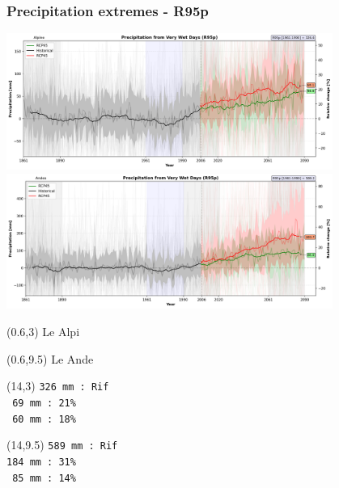 
\begin{frame}
\frametitle{Precipitation extremes - R95p}
\begin{center}

{\includegraphics[width=0.8\textwidth]{risultati/r95p_Alpine_Models_ts}}
{\includegraphics[width=0.8\textwidth]{risultati/r95p_Andes_Models_ts}}
\end{center}

{
  \scriptsize
  \begin{textblock}{1.8}(0.6,3)
     {\color{gray} Le Alpi}
  \end{textblock}
}


{
  \scriptsize
  \begin{textblock}{1.8}(0.6,9.5)
     {\color{gray} Le Ande}
  \end{textblock}
}

{ \tiny
  \begin{textblock}{3}(14,3)
     {\color{CadetBlue}   \texttt{326 mm : Rif}} \\
     {\color{red}         \texttt{ 69 mm : 21\% }}\\
     {\color{ForestGreen} \texttt{ 60 mm : 18\% }}
  \end{textblock}
}

{ \tiny
  \begin{textblock}{3}(14,9.5)
     {\color{CadetBlue}   \texttt{589 mm : Rif}} \\
     {\color{red}         \texttt{184 mm : 31\% }} \\
     {\color{ForestGreen} \texttt{ 85 mm : 14\%  }}
  \end{textblock}
}

\end{frame}

